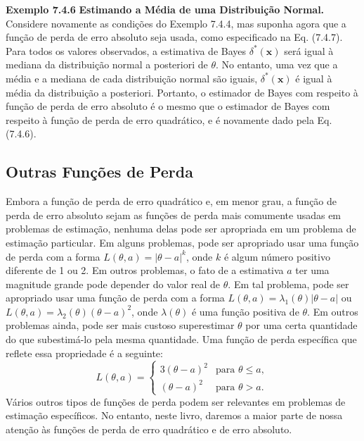 \vspace{1cm}
\noindent\textbf{Exemplo 7.4.6} \quad \textbf{Estimando a Média de uma Distribuição Normal.} Considere novamente as condições do Exemplo 7.4.4, mas suponha agora que a função de perda de erro absoluto seja usada, como especificado na Eq. (7.4.7). Para todos os valores observados, a estimativa de Bayes $\delta^*(\mathbf{x})$ será igual à mediana da distribuição normal a posteriori de $\theta$. No entanto, uma vez que a média e a mediana de cada distribuição normal são iguais, $\delta^*(\mathbf{x})$ é igual à média da distribuição a posteriori. Portanto, o estimador de Bayes com respeito à função de perda de erro absoluto é o mesmo que o estimador de Bayes com respeito à função de perda de erro quadrático, e é novamente dado pela Eq. (7.4.6).

\subsection*{Outras Funções de Perda}
Embora a função de perda de erro quadrático e, em menor grau, a função de perda de erro absoluto sejam as funções de perda mais comumente usadas em problemas de estimação, nenhuma delas pode ser apropriada em um problema de estimação particular. Em alguns problemas, pode ser apropriado usar uma função de perda com a forma $L(\theta, a)=|\theta-a|^k$, onde $k$ é algum número positivo diferente de 1 ou 2. Em outros problemas, o fato de a estimativa $a$ ter uma magnitude grande pode depender do valor real de $\theta$. Em tal problema, pode ser apropriado usar uma função de perda com a forma $L(\theta, a) = \lambda_1(\theta)|\theta-a|$ ou $L(\theta, a)=\lambda_2(\theta)(\theta-a)^2$, onde $\lambda(\theta)$ é uma função positiva de $\theta$. Em outros problemas ainda, pode ser mais custoso superestimar $\theta$ por uma certa quantidade do que subestimá-lo pela mesma quantidade. Uma função de perda específica que reflete essa propriedade é a seguinte:
$$ L(\theta, a) =
\begin{cases}
3(\theta-a)^2 & \text{para } \theta \le a, \\
(\theta-a)^2 & \text{para } \theta > a.
\end{cases}
$$
Vários outros tipos de funções de perda podem ser relevantes em problemas de estimação específicos. No entanto, neste livro, daremos a maior parte de nossa atenção às funções de perda de erro quadrático e de erro absoluto.

